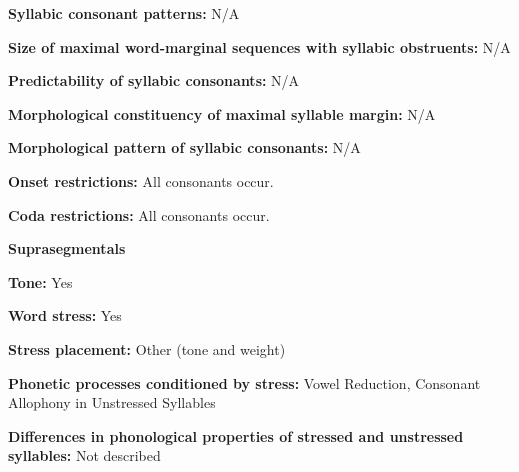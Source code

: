 \begin{styleBody}
\textbf{Syllabic consonant patterns:} N/A
\end{styleBody}

\begin{styleBody}
\textbf{Size of maximal word{}-marginal sequences with syllabic obstruents:} N/A
\end{styleBody}

\begin{styleBody}
\textbf{Predictability of syllabic consonants:} N/A
\end{styleBody}

\begin{styleBody}
\textbf{Morphological constituency of maximal syllable margin:} N/A
\end{styleBody}

\begin{styleBody}
\textbf{Morphological pattern of syllabic consonants:} N/A
\end{styleBody}

\begin{styleBody}
\textbf{Onset restrictions: }All consonants occur.
\end{styleBody}

\begin{styleBody}
\textbf{Coda restrictions: }All consonants occur.
\end{styleBody}

\begin{styleBody}
\textbf{Suprasegmentals}
\end{styleBody}

\begin{styleBody}
\textbf{Tone:} Yes
\end{styleBody}

\begin{styleBody}
\textbf{Word stress:} Yes
\end{styleBody}

\begin{styleBody}
\textbf{Stress placement:} Other (tone and weight)
\end{styleBody}

\begin{styleBody}
\textbf{Phonetic processes conditioned by stress:} Vowel Reduction, Consonant Allophony in Unstressed Syllables
\end{styleBody}

\begin{styleBody}
\textbf{Differences in phonological properties of stressed and unstressed syllables:} Not described
\end{styleBody}

